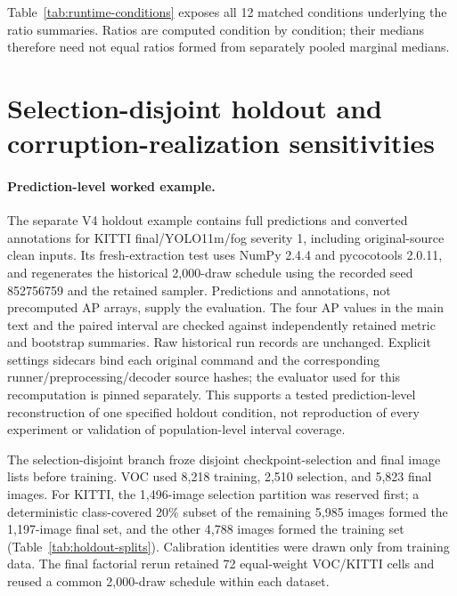 \documentclass[10pt]{article}
\begin{document}
Table~\ref{tab:runtime-conditions} exposes all 12 matched conditions underlying
the ratio summaries. Ratios are computed condition by condition; their medians
therefore need not equal ratios formed from separately pooled marginal medians.

\begin{table}[htbp]
\centering
\caption{Condition-level TensorRT engine-only latency and matched ratios for
the primary YOLO11 grid.}
\label{tab:runtime-conditions}
\scriptsize
\resizebox{\textwidth}{!}{}
\end{table}

\FloatBarrier

\section{Selection-disjoint holdout and corruption-realization sensitivities}
\label{sec:holdout-evidence}

\paragraph{Prediction-level worked example.}
The separate V4 holdout example contains full predictions and converted annotations for KITTI final/YOLO11m/fog severity 1, including original-source clean inputs. Its fresh-extraction test uses NumPy 2.4.4 and pycocotools 2.0.11, and regenerates the historical 2,000-draw schedule using the recorded seed 852756759 and the retained sampler. Predictions and annotations, not precomputed AP arrays, supply the evaluation. The four AP values in the main text and the paired interval are checked against independently retained metric and bootstrap summaries. Raw historical run records are unchanged. Explicit settings sidecars bind each original command and the corresponding runner/preprocessing/decoder source hashes; the evaluator used for this recomputation is pinned separately. This supports a tested prediction-level reconstruction of one specified holdout condition, not reproduction of every experiment or validation of population-level interval coverage.

The selection-disjoint branch froze disjoint checkpoint-selection and final image lists
before training. VOC used 8,218 training, 2,510 selection, and 5,823 final
images. For KITTI, the 1,496-image selection partition was reserved first; a
deterministic class-covered 20\% subset of the remaining 5,985 images formed
the 1,197-image final set, and the other 4,788 images formed the training set
(Table~\ref{tab:holdout-splits}). Calibration identities were drawn only
from training data. The final factorial rerun retained 72 equal-weight
VOC/KITTI cells and reused a common 2,000-draw schedule within each dataset.
\end{document}
